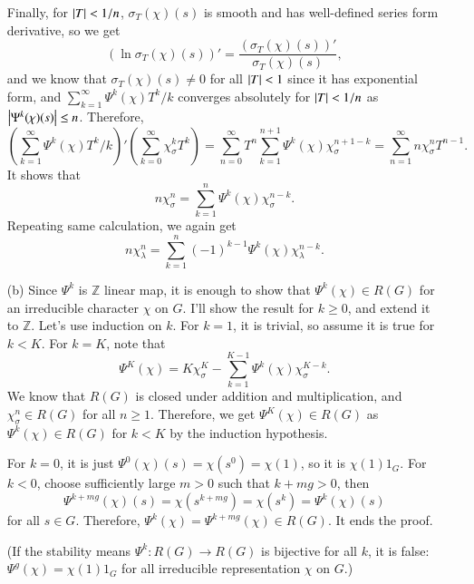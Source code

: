 \documentclass[a4paper, 12pt]{article}
\theoremstyle{Mydefinition}
\theoremstyle{Mytheorem}
\begin{document}
\begin{enumerate}
Finally, for $\abs{T}<1/n$, $\sigma_T(\chi)(s)$ is smooth and has well-defined series form derivative, so we get
\begin{equation}
    (\ln \sigma_T(\chi)(s))' = \frac{(\sigma_T(\chi)(s))'}{\sigma_T(\chi)(s)},
\end{equation}
and we know that $\sigma_T(\chi)(s)\neq 0$ for all $\abs{T}<1$ since it has exponential form, and $\sum_{k=1}^\infty \Psi^k(\chi)T^k/k$ converges absolutely for $\abs{T}<1/n$ as $\abs{\Psi^k(\chi)(s)}\leq n$. Therefore, 
\begin{equation}
    \left(\sum_{k=1}^\infty \Psi^k(\chi)T^k/k\right)'\left(\sum_{k=0}^\infty \chi^k_\sigma T^k\right) = \sum_{n=0}^\infty T^n \sum_{k=1}^{n+1} \Psi^{k}(\chi)\chi_{\sigma}^{n+1-k} = \sum_{n=1}^\infty n\chi_\sigma^n T^{n-1}.
\end{equation}
It shows that
\begin{equation}
    n\chi_\sigma^n = \sum_{k=1}^{n} \Psi^{k}(\chi)\chi_{\sigma}^{n-k}.
\end{equation}
Repeating same calculation, we again get
\begin{equation}
    n\chi_\lambda^n = \sum_{k=1}^{n} (-1)^{k-1}\Psi^{k}(\chi)\chi_{\lambda}^{n-k}.
\end{equation}
\item[(b)]
Since $\Psi^k$ is $\mathbb{Z}$ linear map, it is enough to show that $\Psi^k(\chi)\in R(G)$ for an irreducible character $\chi$ on $G$. I'll show the result for $k\geq 0$, and extend it to $\mathbb{Z}$. Let's use induction on $k$. For $k=1$, it is trivial, so assume it is true for $k<K$. For $k=K$, note that
\begin{equation}
    \Psi^K(\chi) = K\chi_\sigma^K - \sum_{k=1}^{K-1}\Psi^k(\chi)\chi_\sigma^{K-k}.
\end{equation}
We know that $R(G)$ is closed under addition and multiplication, and $\chi_\sigma^n\in R(G)$ for all $n\geq 1$. Therefore, we get $\Psi^K(\chi)\in R(G)$ as $\Psi^k(\chi)\in R(G)$ for $k<K$ by the induction hypothesis.

For $k=0$, it is just $\Psi^0(\chi)(s) = \chi(s^0) = \chi(1)$, so it is $\chi(1)1_G$. For $k<0$, choose sufficiently large $m>0$ such that $k+mg>0$, then
\begin{equation}
    \Psi^{k+mg}(\chi)(s) = \chi(s^{k+mg}) = \chi(s^{k}) = \Psi^k(\chi)(s)
\end{equation}
for all $s\in G$. Therefore, $\Psi^k(\chi)=\Psi^{k+mg}(\chi)\in R(G)$. It ends the proof.

(If the stability means $\Psi^k:R(G)\rightarrow R(G)$ is bijective for all $k$, it is false: $\Psi^g(\chi) = \chi(1)1_G$ for all irreducible representation $\chi$ on $G$.)
\end{enumerate}
\end{document}
